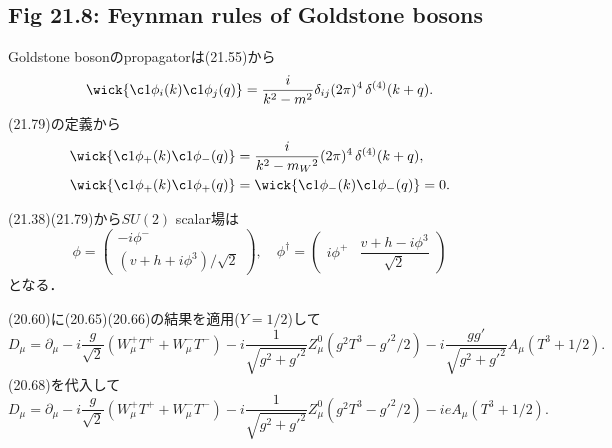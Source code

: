 \subsection{Fig 21.8: Feynman rules of Goldstone bosons}
Goldstone bosonのpropagatorは(21.55)から
\[
\wick{ \c1{\phi_i}(k) \c1{\phi_j}(q) } = \frac{i}{k^2-m^2} \delta_{ij} (2\pi)^4 \mathop{\delta^{(4)}}(k+q) .
\]
(21.79)の定義から
\begin{align*}
  \wick{ \c1{\phi_+}(k) \c1{\phi_-}(q) } &= \frac{i}{k^2-m_W{}^2} (2\pi)^4 \mathop{\delta^{(4)}}(k+q) , \\
  \wick{ \c1{\phi_+}(k) \c1{\phi_+}(q) } &= \wick{ \c1{\phi_-}(k) \c1{\phi_-}(q) } = 0 .
\end{align*}

(21.38)(21.79)から\(SU(2)\) scalar場は
\[
\phi =
\begin{pmatrix}
  -i \phi^- \\
  (v+h+i\phi^3)/\sqrt{2}
\end{pmatrix}
, \quad \phi^\dagger =
\begin{pmatrix}
  i\phi^+ & \dfrac{v+h-i\phi^3}{\sqrt{2}}
\end{pmatrix}
\]
となる．

(20.60)に(20.65)(20.66)の結果を適用(\(Y=1/2\))して
\[
D_\mu = \partial_\mu - i\frac{g}{\sqrt{2}} (W^+_\mu T^+ + W^-_\mu T^-)
- i \frac{1}{\sqrt{g^2+g'^2}} Z^0_\mu (g^2T^3 - g'^2/2)
- i\frac{gg'}{\sqrt{g^2+g'^2}}  A_\mu (T^3+1/2) .
\]
(20.68)を代入して
\[
D_\mu = \partial_\mu - i\frac{g}{\sqrt{2}} (W^+_\mu T^+ + W^-_\mu T^-)
- i \frac{1}{\sqrt{g^2+g'^2}} Z^0_\mu (g^2T^3 - g'^2/2) - ie  A_\mu (T^3+1/2) .
\]


